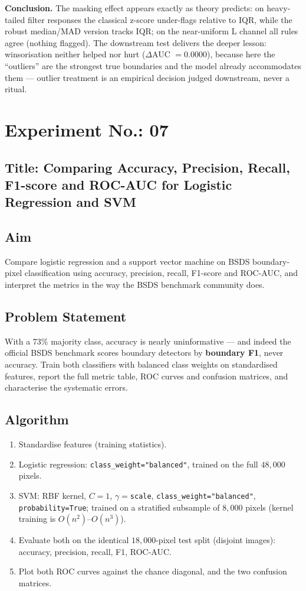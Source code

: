\documentclass[11pt,a4paper]{article}
\newcommand{\labsection}[1]{\subsection*{#1}}
\begin{document}
\textbf{Conclusion.} The masking effect appears exactly as theory predicts: on heavy-tailed filter responses the classical z-score under-flags relative to IQR, while the robust median/MAD version tracks IQR; on the near-uniform L channel all rules agree (nothing flagged). The downstream test delivers the deeper lesson: winsorisation neither helped nor hurt ($\Delta$AUC $=0.0000$), because here the ``outliers'' are the strongest true boundaries and the model already accommodates them --- outlier treatment is an empirical decision judged downstream, never a ritual.

\newpage
\section*{Experiment No.: 07}
\labsection{Title: Comparing Accuracy, Precision, Recall, F1-score and ROC-AUC for Logistic Regression and SVM}

\labsection{Aim}
Compare logistic regression and a support vector machine on BSDS boundary-pixel classification using accuracy, precision, recall, F1-score and ROC-AUC, and interpret the metrics in the way the BSDS benchmark community does.

\labsection{Problem Statement}
With a $73\%$ majority class, accuracy is nearly uninformative --- and indeed the official BSDS benchmark scores boundary detectors by \textbf{boundary F1}, never accuracy. Train both classifiers with balanced class weights on standardised features, report the full metric table, ROC curves and confusion matrices, and characterise the systematic errors.

\labsection{Algorithm}
\begin{enumerate}[nosep]
  \item Standardise features (training statistics).
  \item Logistic regression: \texttt{class\_weight="balanced"}, trained on the full $48{,}000$ pixels.
  \item SVM: RBF kernel, $C=1$, $\gamma=$\texttt{scale}, \texttt{class\_weight="balanced"}, \texttt{probability=True}; trained on a stratified subsample of $8{,}000$ pixels (kernel training is $O(n^2)$--$O(n^3)$).
  \item Evaluate both on the identical $18{,}000$-pixel test split (disjoint images): accuracy, precision, recall, F1, ROC-AUC.
  \item Plot both ROC curves against the chance diagonal, and the two confusion matrices.
\end{enumerate}
\end{document}
